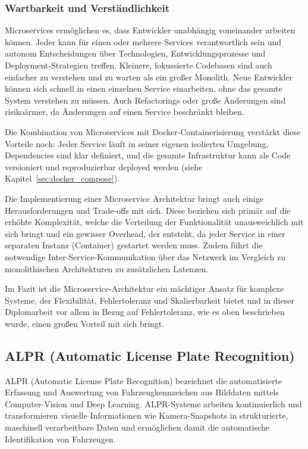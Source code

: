 \subsubsection{Wartbarkeit und Verständlichkeit}
Microservices ermöglichen es, dass Entwickler unabhängig voneinander arbeiten können. Jeder kann für einen oder mehrere Services verantwortlich sein und autonom Entscheidungen über Technologien, Entwicklungsprozesse und Deployment-Strategien treffen.
Kleinere, fokussierte Codebasen sind auch einfacher zu verstehen und zu warten als ein großer Monolith.
Neue Entwickler können sich schnell in einen einzelnen Service einarbeiten, ohne das gesamte System verstehen zu müssen.
Auch Refactorings oder große Änderungen sind risikoärmer, da Änderungen auf einen Service beschränkt bleiben.

Die Kombination von Microservices mit Docker-Containerisierung verstärkt diese Vorteile noch: Jeder Service läuft in seiner eigenen isolierten Umgebung, Dependencies sind klar definiert,
und die gesamte Infrastruktur kann als Code versioniert und reproduzierbar deployed werden (siehe Kapitel~\ref{sec:docker_compose}).

Die Implementierung einer Microservice Architektur bringt auch einige Herausforderungen und Trade-offs mit sich.
Diese beziehen sich primär auf die erhöhte Komplexität, welche die Verteilung der Funktionalität unausweichlich mit sich bringt und ein gewisser Overhead, der entsteht, da jeder Service in einer separaten Instanz (Container) gestartet werden muss.
Zudem führt die notwendige Inter-Service-Kommunikation über das Netzwerk im Vergleich zu monolithischen Architekturen zu zusätzlichen Latenzen.

Im Fazit ist die Microservice-Architektur ein mächtiger Ansatz für komplexe Systeme, der Flexibilität, Fehlertoleranz und Skalierbarkeit bietet und in dieser Diplomarbeit vor allem in Bezug auf Fehlertoleranz, wie es oben beschrieben wurde, einen großen Vorteil mit sich bringt. \cite{ibm_microservices}

\newpage
\subsection{ALPR (Automatic License Plate Recognition)}
\label{sec:alpr}

ALPR (Automatic License Plate Recognition) bezeichnet die automatisierte Erfassung und Auswertung von Fahrzeugkennzeichen aus Bilddaten mittels Computer-Vision und Deep Learning. 
ALPR-Systeme arbeiten kontinuierlich und transformieren visuelle Informationen wie Kamera-Snapshots in strukturierte, maschinell verarbeitbare Daten und ermöglichen damit die automatische Identifikation von Fahrzeugen. \cite{platerecognizer_alpr}

